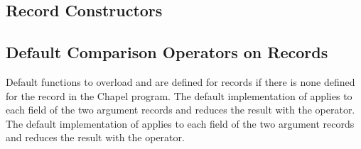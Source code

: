 \subsection{Record Constructors}
\label{Record_Constructors}


\subsection{Default Comparison Operators on Records}
\label{Record_Comparison_Operators}

Default functions to overload \chpl{==} and \chpl{\!=} are defined for
records if there is none defined for the record in the Chapel program.
The default implementation of \chpl{==} applies \chpl{==} to each
field of the two argument records and reduces the result with
the \chpl{&&} operator.  The default implementation of \chpl{\!=}
applies \chpl{\!=} to each field of the two argument records and
reduces the result with the \chpl{||} operator.
